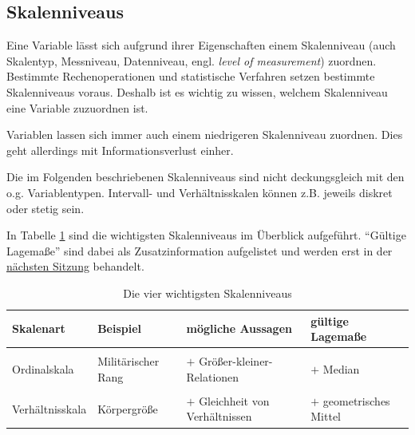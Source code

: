\documentclass[
  11pt,
  ngerman,
  a4paper,
]{report}
\begin{document}
\hypertarget{skalenniveaus}{%
\subsection{Skalenniveaus}\label{skalenniveaus}}

Eine Variable lässt sich aufgrund ihrer Eigenschaften einem Skalenniveau (auch Skalentyp, Messniveau, Datenniveau, engl. \emph{level of measurement}) zuordnen. Bestimmte Rechenoperationen und statistische Verfahren setzen bestimmte Skalenniveaus voraus. Deshalb ist es wichtig zu wissen, welchem Skalenniveau eine Variable zuzuordnen ist.

Variablen lassen sich immer auch einem niedrigeren Skalenniveau zuordnen. Dies geht allerdings mit Informationsverlust einher.

Die im Folgenden beschriebenen Skalenniveaus sind nicht deckungsgleich mit den o.g. Variablentypen. Intervall- und Verhältnisskalen können z.B. jeweils diskret oder stetig sein.

In Tabelle \ref{tab:skalen} sind die wichtigsten Skalenniveaus im Überblick aufgeführt. \enquote{Gültige Lagemaße} sind dabei als Zusatzinformation aufgelistet und werden erst in der \protect\hyperlink{lagemauxdfe}{nächsten Sitzung} behandelt.

\begin{table}

\caption{\label{tab:skalen}Die vier wichtigsten Skalenniveaus}
\centering
\begin{tabular}[t]{ll>{\raggedright\arraybackslash}p{8cm}>{\raggedright\arraybackslash}p{8cm}}
\toprule
\textbf{Skalenart} & \textbf{Beispiel} & \textbf{mögliche Aussagen} & \textbf{gültige Lagemaße}\\
\midrule
\cellcolor{gray!6}{Nominalskala} & \cellcolor{gray!6}{Postleitzahl} & \cellcolor{gray!6}{Gleichheit, Verschiedenheit} & \cellcolor{gray!6}{Modus}\\
Ordinalskala & Militärischer Rang & $+$ Größer-kleiner-Relationen & $+$ Median\\
\cellcolor{gray!6}{Intervallskala} & \cellcolor{gray!6}{Temperatur in °C} & \cellcolor{gray!6}{$+$ Gleichheit von Differenzen} & \cellcolor{gray!6}{$+$ arithmetisches Mittel}\\
Verhältnisskala & Körpergröße & $+$ Gleichheit von Verhältnissen & $+$ geometrisches Mittel\\
\bottomrule
\end{tabular}
\end{table}
\end{document}
